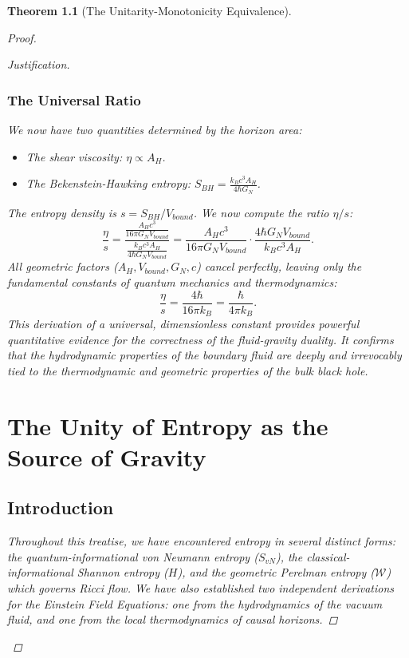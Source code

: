 \documentclass[11pt, letterpaper]{report}
\theoremstyle{plain} %
\newtheorem{theorem}{Theorem}[chapter]
\theoremstyle{definition} %
\theoremstyle{remark} %
\begin{document}
\begin{theorem}[The Unitarity-Monotonicity Equivalence]
\begin{proof}
\begin{proof}[Justification]
\subsection{The Universal Ratio}
We now have two quantities determined by the horizon area:
\begin{itemize}
    \item The shear viscosity: $\eta \propto A_H$.
    \item The Bekenstein-Hawking entropy: $S_{BH} = \frac{k_B c^3 A_H}{4\hbar G_N}$.
\end{itemize}
The entropy density is $s = S_{BH}/V_{bound}$. We now compute the ratio $\eta/s$:
\begin{equation}
    \frac{\eta}{s} = \frac{\frac{A_H c^3}{16\pi G_N V_{bound}}}{\frac{k_B c^3 A_H}{4\hbar G_N V_{bound}}} = \frac{A_H c^3}{16\pi G_N V_{bound}} \cdot \frac{4\hbar G_N V_{bound}}{k_B c^3 A_H}.
\end{equation}
All geometric factors ($A_H, V_{bound}, G_N, c$) cancel perfectly, leaving only the fundamental constants of quantum mechanics and thermodynamics:
\begin{equation}
    \boxed{\frac{\eta}{s} = \frac{4\hbar}{16\pi k_B} = \frac{\hbar}{4\pi k_B}}.
\end{equation}
This derivation of a universal, dimensionless constant provides powerful quantitative evidence for the correctness of the fluid-gravity duality. It confirms that the hydrodynamic properties of the boundary fluid are deeply and irrevocably tied to the thermodynamic and geometric properties of the bulk black hole.

\appendix
\chapter{The Unity of Entropy as the Source of Gravity}
\label{app:unity_of_entropy}

\section{Introduction}

Throughout this treatise, we have encountered entropy in several distinct forms: the quantum-informational von Neumann entropy ($S_{vN}$), the classical-informational Shannon entropy ($H$), and the geometric Perelman entropy ($\mathcal{W}$) which governs Ricci flow. We have also established two independent derivations for the Einstein Field Equations: one from the hydrodynamics of the vacuum fluid, and one from the local thermodynamics of causal horizons.


\end{proof}
\end{proof}
\end{theorem}
\end{document}
